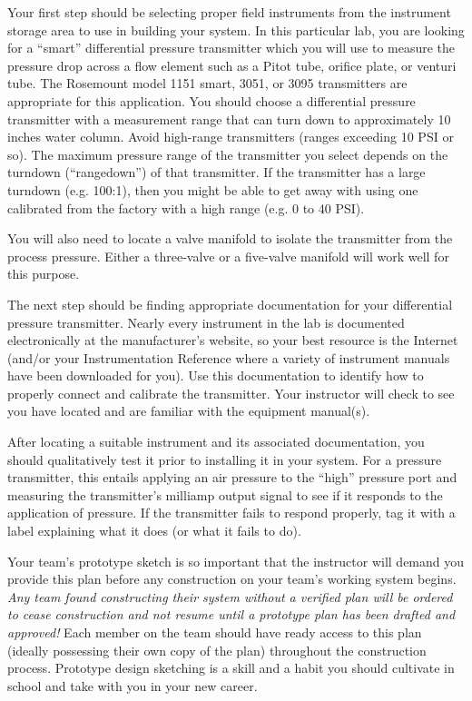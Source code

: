 \vskip 10pt

Your first step should be selecting proper field instruments from the instrument storage area to use in building your system.  In this particular lab, you are looking for a ``smart'' differential pressure transmitter which you will use to measure the pressure drop across a flow element such as a Pitot tube, orifice plate, or venturi tube.  The Rosemount model 1151 smart, 3051, or 3095 transmitters are appropriate for this application.  You should choose a differential pressure transmitter with a measurement range that can turn down to approximately 10 inches water column.  Avoid high-range transmitters (ranges exceeding 10 PSI or so).  The maximum pressure range of the transmitter you select depends on the turndown (``rangedown'') of that transmitter.  If the transmitter has a large turndown (e.g. 100:1), then you might be able to get away with using one calibrated from the factory with a high range (e.g. 0 to 40 PSI).  

You will also need to locate a valve manifold to isolate the transmitter from the process pressure.  Either a three-valve or a five-valve manifold will work well for this purpose.

The next step should be finding appropriate documentation for your differential pressure transmitter.  Nearly every instrument in the lab is documented electronically at the manufacturer's website, so your best resource is the Internet (and/or your Instrumentation Reference where a variety of instrument manuals have been downloaded for you).  Use this documentation to identify how to properly connect and calibrate the transmitter.  Your instructor will check to see you have located and are familiar with the equipment manual(s).

After locating a suitable instrument and its associated documentation, you should qualitatively test it prior to installing it in your system.  For a pressure transmitter, this entails applying an air pressure to the ``high'' pressure port and measuring the transmitter's milliamp output signal to see if it responds to the application of pressure.  If the transmitter fails to respond properly, tag it with a label explaining what it does (or what it fails to do).

\vskip 10pt

Your team's prototype sketch is so important that the instructor will demand you provide this plan before any construction on your team's working system begins.  {\it Any team found constructing their system without a verified plan will be ordered to cease construction and not resume until a prototype plan has been drafted and approved!}  Each member on the team should have ready access to this plan (ideally possessing their own copy of the plan) throughout the construction process.  Prototype design sketching is a skill and a habit you should cultivate in school and take with you in your new career.

